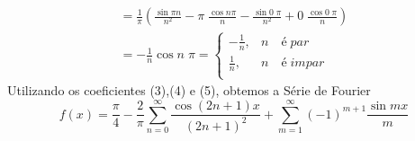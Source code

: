 \documentclass[12pt]{article}
\begin{document}
\begin{enumerate}[label=S.]
\begin{equation}
\begin{split}
    = \frac{1}{\pi}\left( \frac{\sin \pi n}{n^{2}}-\pi\;\frac{\cos n\pi}{n}-\frac{\sin 0\;\pi}{n^{2}}+0\;\frac{\cos 0\;\pi}{n}\right) \\
    = -\frac{1}{n}\cos n\;\pi = 
    \begin{cases}
    -\frac{1}{n} , & n \quad é\;  par\\
    \frac{1}{n} , & n \quad é\;  impar\\
    \end{cases}
    \end{split}\end{equation}
    Utilizando os coeficientes (3),(4) e (5), obtemos a Série de Fourier
    \begin{equation}
    f(x) = \frac{\pi}{4} - \frac{2}{\pi} \sum_{n=0}^{\infty} \frac{\cos(2n+1)x}{(2n+1)^{2}} +\sum_{m=1}^{\infty} (-1)^{m+1}\frac{\sin mx}{m}
    \end{equation}
    \end{enumerate}
\end{document}
